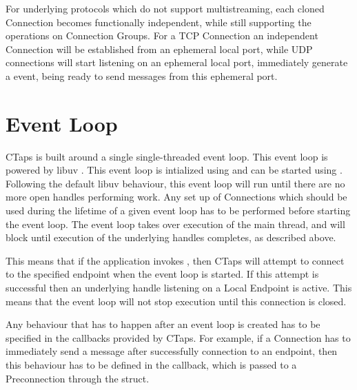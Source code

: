 For underlying protocols which do not support multistreaming, each cloned
Connection becomes functionally independent, while still supporting the
operations on Connection Groups. For a TCP Connection an independent Connection
will be established from an ephemeral local port, while UDP connections will
start listening on an ephemeral local port, immediately generate a 
event, being ready to send messages from this ephemeral port.

\section{Event Loop}
CTaps is built around a single single-threaded event loop. This event
loop is powered by libuv \cite{Libuv2025}. This event loop is intialized
using  and can be started using .
Following the default libuv behaviour, this event loop will run until
there are no more open handles performing work. Any set up of Connections
which should be used during the lifetime of a given event loop has to
be performed before starting the event loop. The event loop takes over
execution of the main thread, and will block until execution of the underlying
handles completes, as described above.

This means that if the application invokes ,
then CTaps will attempt to connect to the specified endpoint when the event
loop is started. If this attempt is successful then an underlying handle
listening on a Local Endpoint is active. This means that the event loop
will not stop execution until this connection is closed.

Any behaviour that has to happen after an event loop is created has to be
specified in the callbacks provided by CTaps. For example, if a Connection
has to immediately send a message after successfully connection to an endpoint,
then this behaviour has to be defined in the  callback, which is
passed to a Preconnection through the  struct.


